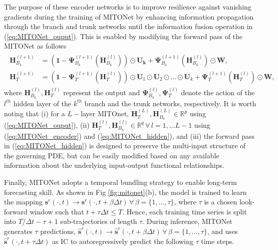 \documentclass[draft]{agujournal2019}
\begin{document}
The purpose of these encoder networks is to improve resilience against vanishing gradients during the training of MITONet by enhancing information propagation through the branch and trunk networks until the information fusion operation in (\ref{eq:MITONet_ouput}). This is enabled by modifying the forward pass of the MITONet as follows
\begin{eqnarray}\begin{split}
\mathbf{H}^{(l+1)}_{B_k} &= (\mathbf{1} - \boldsymbol{\Psi}^{(l+1)}_{B_k}(\mathbf{H}^{(l)}_{B_k})) \odot \mathbf{U_k} + \boldsymbol{\Psi}^{(l+1)}_{B_k}(\mathbf{H}^{(l)}_{B_k}) \odot \mathbf{W}, \\
\mathbf{H}^{(l+1)}_T &= (\mathbf{1} - \boldsymbol{\Psi}^{(l+1)}_{T}(\mathbf{H}^{(l)}_T)) \odot \mathbf{U}_1 \odot \mathbf{U}_2 \odot \dots \odot \mathbf{U}_k + \boldsymbol{\Psi}^{(l+1)}_{T}(\mathbf{H}^{(l)}_T) \odot \mathbf{W},
\label{eq:MITONet_hidden}
\end{split}\end{eqnarray}
where $\mathbf{H}^{(l)}_{B_k}, \mathbf{H}^{(l)}_{T}$ represent the output and $\boldsymbol{\Psi}^{(l)}_{B_k}, \boldsymbol{\Psi}^{(l)}_{T}$ denote the action of the $l^{th}$ hidden layer of the $k^{th}$ branch and the trunk networks, respectively. It is worth noting that (i) for a $L-$layer MITOnet, $\mathbf{H}^{(L)}_T, \mathbf{H}^{(L)}_{B_k} \in  \mathbb{R}^p$ using (\ref{eq:MITONet_ouput}), (ii) $\mathbf{H}^{(l)}_T, \mathbf{H}^{(l)}_{B_k} \in  \mathbb{R}^q \, \forall \, l=1,\ldots L-1$ using (\ref{eq:MITONet_encoder}) and (\ref{eq:MITONet_hidden}), and (iii) the forward pass in (\ref{eq:MITONet_hidden}) is designed to preserve the multi-input structure of the governing PDE, but can be easily modified based on any available information about the underlying input-output functional relationships. 

Finally, MITONet adopts a temporal bundling strategy \cite{brandstetter2022message} to enable long-term forecasting skill. As shown in Fig \ref{fig:mitonet}(b), the model is trained to learn the mapping $\mathbf{s}^r(\cdot, t) \rightarrow \mathbf{s}^r(\cdot, t+ \beta \Delta t) \, \forall \, \beta = \{1, \ldots, \tau\}$, where $\tau$ is a chosen look-forward window such that $t + \tau \Delta t \leq T$. Hence, each training time series is split into $T/\Delta t - \tau + 1$ sub-trajectories of length $\tau$. During inference, MITONet generates $\tau$ predictions, $\hat{\mathbf{s}}^r(\cdot, t) \rightarrow \hat{\mathbf{s}}^r(\cdot, t+ \beta \Delta t) \, \forall \, \beta = \{1, \ldots, \tau\}$, and uses $\hat{\mathbf{s}}^r(\cdot, t+ \tau \Delta t)$ as IC to autoregressively predict the following $\tau$ time steps. 
\end{document}

